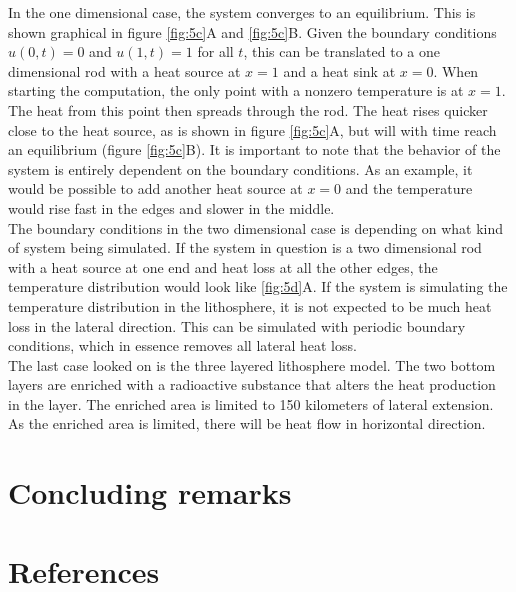 \documentclass[10pt,a4paper]{article}
\begin{document}
\noindent In the one dimensional case, the system converges to an equilibrium. This is shown graphical in figure \ref{fig:5c}A and \ref{fig:5c}B. Given the boundary conditions $u(0,t)=0$ and $u(1,t)=1$ for all $t$, this can be translated to a one dimensional rod with  a heat source at $x=1$ and a heat sink at $x=0$. When starting the computation, the only point with a nonzero temperature is at $x=1$. The heat from this point then spreads through the rod. The heat rises quicker close to the heat source, as is shown in figure \ref{fig:5c}A, but will with time reach an equilibrium (figure \ref{fig:5c}B). It is important to note that the behavior of the system is entirely dependent on the boundary conditions. As an example, it would be possible to add another heat source at $x=0$ and the temperature would rise fast in the edges and slower in the middle. 
\\

\noindent The boundary conditions in the two dimensional case is depending on what kind of system being simulated. If the system in question is a two dimensional rod with a heat source at one end and heat loss at all the other edges, the temperature distribution would look like \ref{fig:5d}A. If the system is simulating the temperature distribution in the lithosphere, it is not expected to be much heat loss in the lateral direction. This can be simulated with periodic boundary conditions, which in essence removes all lateral heat loss. 
\\

\noindent The last case looked on is the three layered lithosphere model. The two bottom layers are enriched with a radioactive substance that alters the heat production in the layer. The enriched area is limited to 150 kilometers of lateral extension. As the enriched area is limited, there will be heat flow in horizontal direction.  








\newpage
\section*{Concluding remarks}





\newpage
\section*{References}
\end{document}

